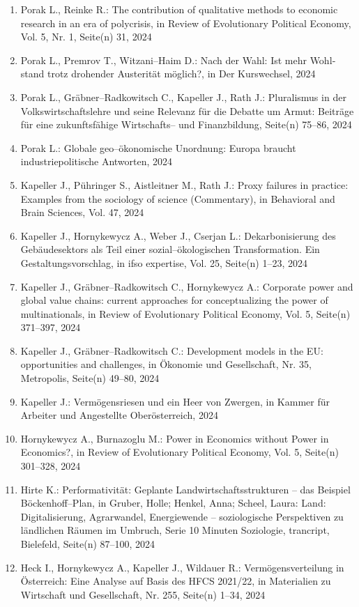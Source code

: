 \begin{enumerate}
	 \item Porak L., Reinke R.: The contribution of qualitative methods to economic research in an era of polycrisis, in Review of Evolutionary Political Economy, Vol. 5, Nr. 1, Seite(n) 31, 2024
	 \item Porak L., Premrov T., Witzani--Haim D.: Nach der Wahl: Ist mehr Wohl­stand trotz dro­hen­der Aus­teri­tät möglich?, in Der Kurswechsel, 2024
	 \item Porak L., Gräbner--Radkowitsch C., Kapeller J., Rath J.: Pluralismus in der Volkswirtschaftslehre und seine Relevanz für die Debatte um Armut: Beiträge für eine zukunftsfähige Wirtschafts-- und Finanzbildung, Seite(n) 75--86, 2024
	 \item Porak L.: Globale geo--ökonomische Unordnung: Europa braucht industriepolitische Antworten, 2024
	 \item Kapeller J., Pühringer S., Aistleitner M., Rath J.: Proxy failures in practice: Examples from the sociology of science (Commentary), in Behavioral and Brain Sciences, Vol. 47, 2024
	 \item Kapeller J., Hornykewycz A., Weber J., Cserjan L.: Dekarbonisierung des Gebäudesektors als Teil einer sozial--ökologischen Transformation. Ein Gestaltungsvorschlag, in ifso expertise, Vol. 25, Seite(n) 1--23, 2024
	 \item Kapeller J., Gräbner--Radkowitsch C., Hornykewycz A.: Corporate power and global value chains: current approaches for conceptualizing the power of multinationals, in Review of Evolutionary Political Economy, Vol. 5, Seite(n) 371--397, 2024
	 \item Kapeller J., Gräbner--Radkowitsch C.: Development models in the EU:  opportunities and challenges, in Ökonomie und Gesellschaft, Nr. 35, Metropolis, Seite(n) 49--80, 2024
	 \item Kapeller J.: Vermögensriesen und ein Heer von Zwergen, in Kammer für Arbeiter und Angestellte Oberösterreich, 2024
	 \item Hornykewycz A., Burnazoglu M.: Power in Economics without Power in Economics?, in Review of Evolutionary Political Economy, Vol. 5, Seite(n) 301--328, 2024
	 \item Hirte K.: Performativität: Geplante Landwirtschaftsstrukturen – das Beispiel Böckenhoff--Plan, in Gruber, Holle; Henkel, Anna; Scheel, Laura: Land: Digitalisierung, Agrarwandel, Energiewende – soziologische Perspektiven zu ländlichen Räumen im Umbruch, Serie 10 Minuten Soziologie, trancript, Bielefeld, Seite(n) 87--100, 2024
	 \item Heck I., Hornykewycz A., Kapeller J., Wildauer R.: Vermögensverteilung  in Österreich: Eine Analyse auf Basis des HFCS 2021/22, in Materialien zu Wirtschaft und Gesellschaft, Nr. 255, Seite(n) 1--34, 2024

\end{enumerate}
